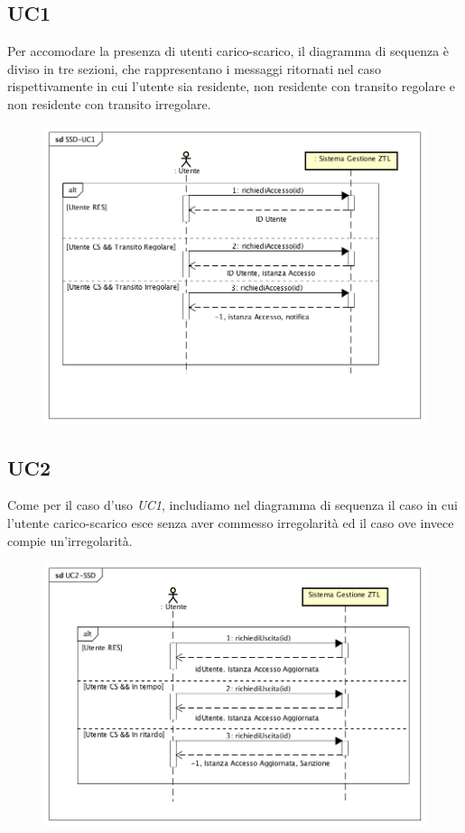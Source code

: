 \documentclass[12pt, letterpaper]{article}
\begin{document}
\subsection{UC1}
Per accomodare la presenza di utenti 
carico-scarico, il diagramma di sequenza è 
diviso in tre sezioni, che rappresentano 
i messaggi ritornati nel caso rispettivamente 
in cui l'utente sia residente, non residente con 
transito regolare e non residente con transito 
irregolare. 
\begin{figure}[H]
    \centering
    \includegraphics[scale=0.50]{SSD-UC1}
    \label{fig:mesh1}
\end{figure}

\subsection{UC2}
Come per il caso d'uso \emph{UC1}, includiamo 
nel diagramma di sequenza il caso in cui 
l'utente carico-scarico esce senza aver commesso 
irregolarità ed il caso ove invece compie 
un'irregolarità.
\begin{figure}[H]
    \centering
    \includegraphics[scale=0.50]{SSD-UC2}
    \label{fig:mesh1}
\end{figure}
\end{document}

